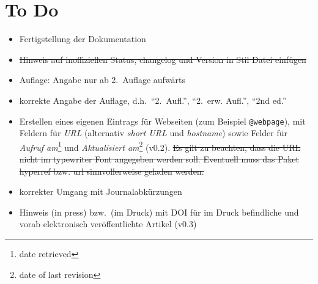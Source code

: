 \documentclass[a4paper,10pt]{scrartcl}
\begin{document}
\section{To Do}
\begin{itemize}
 \item Fertigstellung der Dokumentation
 \item \sout{Hinweis auf inoffiziellen Status, changelog und Version in Stil
Datei
einfügen}
 \item Auflage: Angabe nur ab 2.~Auflage aufwärts
 \item korrekte Angabe der Auflage, d.h.\ "`2.~Aufl."', "`2.~erw. Aufl."', "`2nd
ed."'
 \item Erstellen eines eigenen Eintrags für Webseiten (zum Beispiel
\verb|@webpage|), mit Feldern für \emph{URL} (alternativ \emph{short URL} und
\emph{hostname}) sowie Felder für \emph{Aufruf am}\footnote{date retrieved} und
\emph{Aktualisiert am}\footnote{date of last revision} (v0.2). \sout{Es gilt zu
beachten,
dass die URL nicht im typewriter Font angegeben werden soll. Eventuell muss das
Paket hyperref bzw. url sinnvollerweise geladen werden.}
\item korrekter Umgang mit Journalabkürzungen
\item Hinweis (in press) bzw.\ (im Druck) mit DOI f\"ur im Druck befindliche und
vorab elektronisch ver\"offentlichte Artikel (v0.3)
\end{itemize}


\newpage
\label{sec:Literaturverzeichnis}

\nocite{*}

%
\end{document}
